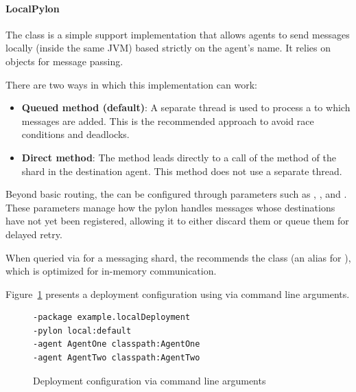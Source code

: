 \documentclass{article}
\begin{document}
\paragraph{LocalPylon}

The  class is a simple support implementation that allows agents to send messages locally (inside the same JVM) based strictly on the agent's name. It relies on  objects for message passing.

There are two ways in which this implementation can work:
\begin{itemize}
    \item \textbf{Queued method (default)}: A separate thread is used to process a  to which messages are added. This is the recommended approach to avoid race conditions and deadlocks.
    \item \textbf{Direct method}: The  method leads directly to a call of the  method of the shard in the destination agent. This method does not use a separate thread.
\end{itemize}

Beyond basic routing, the  can be configured through parameters such as , , and . These parameters manage how the pylon handles messages whose destinations have not yet been registered, allowing it to either discard them or queue them for delayed retry.

When queried via  for a messaging shard, the  recommends the  class (an alias for ), which is optimized for in-memory communication.


Figure~\ref{fig:func:LocalPylon:code} presents a 
deployment configuration using  via command line arguments.

\begin{figure}[ht]\centering
\begin{lstlisting}
-package example.localDeployment
-pylon local:default
-agent AgentOne classpath:AgentOne
-agent AgentTwo classpath:AgentTwo
\end{lstlisting}
\caption{Deployment configuration via command line arguments}\label{fig:func:LocalPylon:code}
\end{figure}
\end{document}
